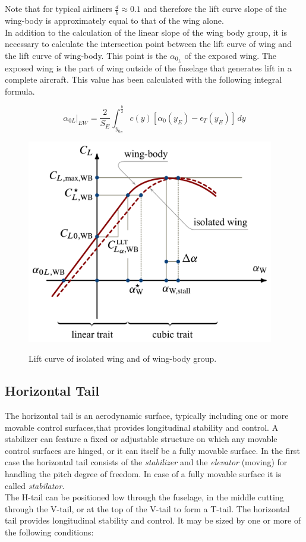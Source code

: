 \noindent  \\ \\
Note that for typical airliners $\frac{d}{b} \approx 0.1$ and therefore the lift curve slope of the wing-body is approximately equal to that of the wing alone.\\
In addition to the calculation of the linear slope of the wing body group, it is necessary to calculate the intersection point between the lift curve of wing and the lift curve of wing-body. This point is the $\alpha_{0_L}$ of the exposed wing. The exposed wing is the part of wing outside of the fuselage that generates lift in a complete aircraft. This value has been calculated with the following integral formula.

\begin{equation}
\alpha_{0L} |_{EW} = \frac{2}{S_E}\int_{y_{0_E}}^{\frac{b}{2}} c(y) [ \alpha_0(y_E) - \epsilon_T(y_E) ] \, dy
\end{equation}


\begin{figure}[H]
\centering
{\includegraphics[height=8.9cm]{Immagini/WingBody_CL_Vs_alpha_curve}} 
\label{wblc}
\caption{Lift curve of isolated wing and of wing-body group.}
\end{figure} 		


\subsection{Horizontal Tail}

The horizontal tail  is an aerodynamic surface, typically including one or more movable control surfaces,that provides longitudinal stability and control. A stabilizer can feature a fixed or adjustable structure on which any movable control surfaces are hinged, or it can itself be a fully movable surface. In the first case the horizontal tail consists of the {\itshape stabilizer} and the  {\itshape elevator} (moving) for handling the pitch degree of freedom. In case of a fully movable surface it is called  {\itshape stabilator}. \\
 The H-tail can be positioned low through the fuselage, in the middle cutting through the V-tail, or at the top of the V-tail to form a T-tail. \cite{kundu}
The horizontal tail provides longitudinal stability and control. It may be sized by one or more of the following conditions\cite{obert2009aerodynamic}:

